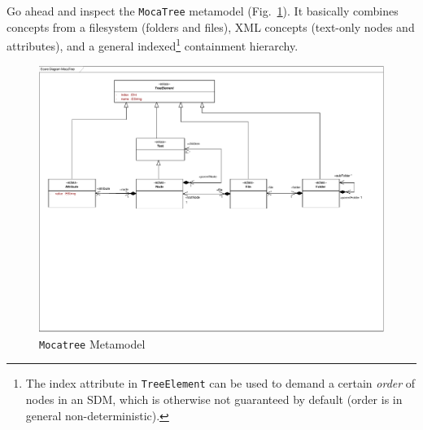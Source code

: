 Go ahead and inspect the \texttt{MocaTree} metamodel (Fig.~\ref{fig:moca-tree}).
It basically combines concepts from a filesystem (folders and files), XML concepts (text-only nodes and attributes), and a general indexed\footnote{The index attribute in \texttt{TreeElement} can be used to demand a certain \emph{order} of nodes in an SDM, which is otherwise not guaranteed by default (order is in general non-deterministic).} containment hierarchy.

\begin{figure}[!htbp]
\begin{center}
 \includegraphics[width=\textwidth]{pics/moca/0Install/0-MocaTree}
  \caption{\texttt{Mocatree} Metamodel}
  \label{fig:moca-tree}
\end{center}
\end{figure}
 

